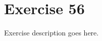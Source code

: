 \section{Exercise 56}
\begin{question}
   Exercise description goes here. 
\end{question}

\begin{solution}
\end{solution}

